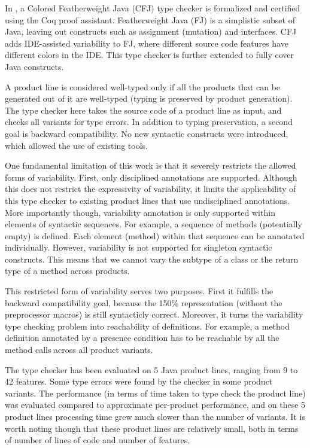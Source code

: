 \documentclass[11pt]{article}
\begin{document}
In \cite{Kastner:2012}, a Colored Featherweight Java (CFJ) type checker is formalized and certified using the Coq\cite{Bertot:2010} proof assistant. Featherweight Java (FJ) is a simplistic subset of Java, leaving out constructs such as assignment (mutation) and interfaces. CFJ adds IDE-assisted variability to FJ, where different source code features have different colors in the IDE. This type checker is further extended to fully cover Java constructs.

A product line is considered well-typed only if all the products that can be generated out of it are well-typed (typing is preserved by product generation). The type checker here takes the source code of a product line as input, and checks all variants for type errors. In addition to typing preservation, a second goal is backward compatibility. No new syntactic constructs were introduced, which allowed the use of existing tools.

One fundamental limitation of this work is that it severely restricts the allowed forms of variability. First, only disciplined annotations are supported. Although this does not restrict the expressivity of variability, it limits the applicability of this type checker to existing product lines that use undisciplined annotations. More importantly though, variability annotation is only supported within elements of syntactic sequences. For example, a sequence of methods (potentially empty) is defined. Each element (method) within that sequence can be annotated individually. However, variability is not supported for singleton syntactic constructs. This means that we cannot vary the subtype of a class or the return type of a method across products.

This restricted form of variability serves two purposes. First it fulfills the backward compatibility goal, because the 150\% representation (without the preprocessor macros) is still syntacticly correct. Moreover, it turns the variability type checking problem into reachability of definitions. For example, a method definition annotated by a presence condition has to be reachable by all the method calls across all product variants. 
 
The type checker has been evaluated on 5 Java product lines, ranging from 9 to 42 features. Some type errors were found by the checker in some product variants. The performance (in terms of time taken to type check the product line) was evaluated compared to approximate per-product performance, and on these 5 product lines processing time grew much slower than the number of variants. It is worth noting though that these product lines are relatively small, both in terms of number of lines of code and number of features. 
\end{document}

